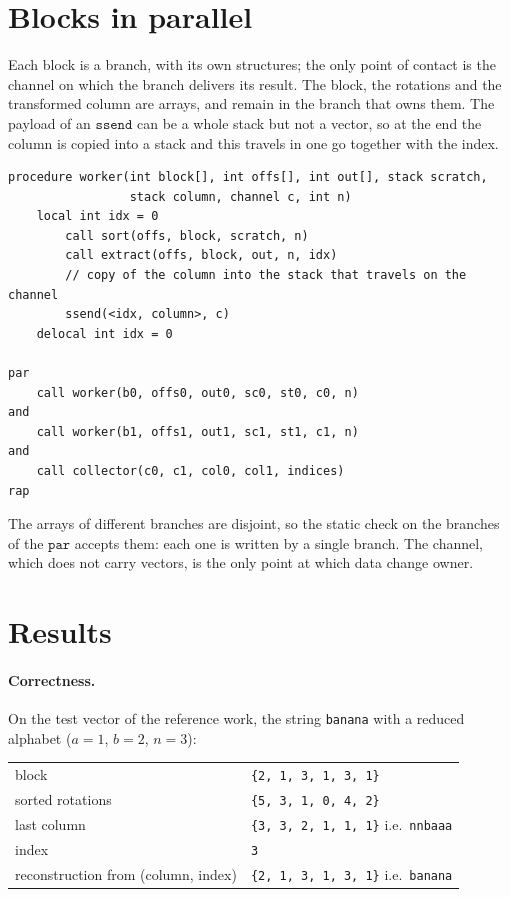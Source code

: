 \section{Blocks in parallel}

Each block is a branch, with its own structures; the only point of contact is the
channel on which the branch delivers its result. The block, the rotations and the
transformed column are arrays, and remain in the branch that owns them. The payload of an
$\mathtt{ssend}$ can be a whole stack but not a vector, so at the end
the column is copied into a stack and this travels in one go together with the
index.

\begin{lstlisting}
procedure worker(int block[], int offs[], int out[], stack scratch,
                 stack column, channel c, int n)
    local int idx = 0
        call sort(offs, block, scratch, n)
        call extract(offs, block, out, n, idx)
        // copy of the column into the stack that travels on the channel
        ssend(<idx, column>, c)
    delocal int idx = 0

par
    call worker(b0, offs0, out0, sc0, st0, c0, n)
and
    call worker(b1, offs1, out1, sc1, st1, c1, n)
and
    call collector(c0, c1, col0, col1, indices)
rap
\end{lstlisting}

\noindent
The arrays of different branches are disjoint, so the static check on the branches
of the $\mathtt{par}$ accepts them: each one is written by a single branch. The channel, which
does not carry vectors, is the only point at which data change owner.

\section{Results}

\paragraph{Correctness.} On the test vector of the reference work, the
string \texttt{banana} with a reduced alphabet ($a=1$, $b=2$, $n=3$):

\begin{center}
\begin{tabular}{ll}
\hline
block & \texttt{\{2, 1, 3, 1, 3, 1\}}\\
sorted rotations & \texttt{\{5, 3, 1, 0, 4, 2\}}\\
last column & \texttt{\{3, 3, 2, 1, 1, 1\}} \quad i.e.\ \texttt{nnbaaa}\\
index & \texttt{3}\\
reconstruction from (column, index) & \texttt{\{2, 1, 3, 1, 3, 1\}} \quad i.e.\ \texttt{banana}\\
\hline
\end{tabular}
\end{center}

